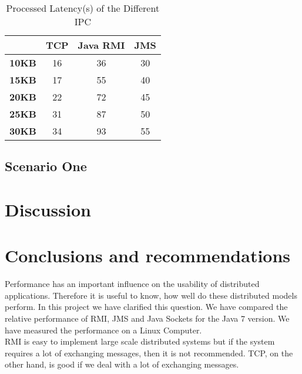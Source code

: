 \documentclass{article}
\begin{document}
\begin{table}[!t]
\centering
\begin{tabular}{|c|c|c|c|}
\hline
 & \textbf{TCP} & \textbf{Java RMI} & \textbf{JMS}\\ 
\hline
 \textbf{10KB} & 16 & 36 & 30\\ 
\hline
 \textbf{15KB} & 17 & 55 & 40\\ 
\hline
 \textbf{20KB} & 22 & 72 & 45\\ 
\hline
 \textbf{25KB} & 31 & 87 & 50\\ 
\hline
 \textbf{30KB} & 34 & 93 & 55\\ 
\hline
\hline\end{tabular}
\label{table:table}
\caption{Processed Latency(s) of the Different IPC}
\end{table}



\subsection{Scenario One}


\section{Discussion}



\section{Conclusions and recommendations}

Performance has an important influence on the usability of distributed applications. Therefore it is useful to know, how well do these distributed models perform. In this project we have clarified this question. We have compared the relative performance of RMI, JMS and Java Sockets for the Java 7 version. We have measured the performance on a Linux Computer. \\

RMI is easy to implement large scale distributed systems but if the system requires a lot of exchanging messages, then it is not recommended. TCP, on the other hand, is good if we deal with a lot of exchanging messages. \\
\end{document}
